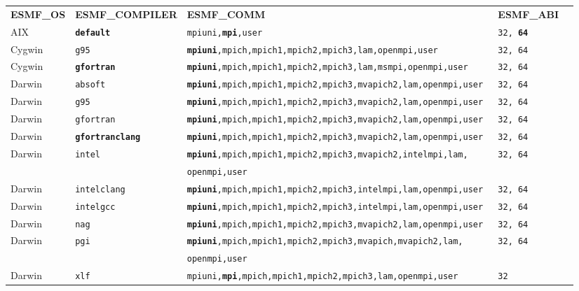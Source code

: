 \begin{longtable}{lllll}
  {\bfseries\footnotesize ESMF\_OS} &{\bfseries\footnotesize ESMF\_COMPILER} & {\bfseries\footnotesize ESMF\_COMM} & {\bfseries\footnotesize ESMF\_ABI} \\

AIX     &\tt {\bf default}        &\footnotesize \tt mpiuni,{\bf mpi},user      &\tt 32, {\bf 64} \\
Cygwin  &\tt g95                  &\footnotesize \tt {\bf mpiuni},mpich,mpich1,mpich2,mpich3,lam,openmpi,user &\tt 32, 64 \\
Cygwin  &\tt {\bf gfortran}       &\footnotesize \tt {\bf mpiuni},mpich,mpich1,mpich2,mpich3,lam,msmpi,openmpi,user &\tt 32, 64 \\
Darwin  &\tt absoft               &\footnotesize \tt {\bf mpiuni},mpich,mpich1,mpich2,mpich3,mvapich2,lam,openmpi,user &\tt 32, 64 \\
Darwin  &\tt g95                  &\footnotesize \tt {\bf mpiuni},mpich,mpich1,mpich2,mpich3,mvapich2,lam,openmpi,user &\tt 32, 64 \\
Darwin  &\tt gfortran             &\footnotesize \tt {\bf mpiuni},mpich,mpich1,mpich2,mpich3,mvapich2,lam,openmpi,user &\tt 32, 64 \\
Darwin  &\tt {\bf gfortranclang}  &\footnotesize \tt {\bf mpiuni},mpich,mpich1,mpich2,mpich3,mvapich2,lam,openmpi,user &\tt 32, 64 \\
Darwin  &\tt intel                &\footnotesize \tt {\bf mpiuni},mpich,mpich1,mpich2,mpich3,mvapich2,intelmpi,lam, &\tt 32, 64 \\
        &                         &\footnotesize \tt openmpi,user &  \\
Darwin  &\tt intelclang           &\footnotesize \tt {\bf mpiuni},mpich,mpich1,mpich2,mpich3,intelmpi,lam,openmpi,user &\tt 32, 64 \\
Darwin  &\tt intelgcc             &\footnotesize \tt {\bf mpiuni},mpich,mpich1,mpich2,mpich3,intelmpi,lam,openmpi,user &\tt 32, 64 \\
Darwin  &\tt nag                  &\footnotesize \tt {\bf mpiuni},mpich,mpich1,mpich2,mpich3,mvapich2,lam,openmpi,user &\tt 32, 64 \\
Darwin  &\tt pgi                  &\footnotesize \tt {\bf mpiuni},mpich,mpich1,mpich2,mpich3,mvapich,mvapich2,lam, &\tt 32, 64 \\
        &                         &\footnotesize \tt openmpi,user &  \\
Darwin  &\tt xlf                  &\footnotesize \tt mpiuni,{\bf mpi},mpich,mpich1,mpich2,mpich3,lam,openmpi,user &\tt 32 \\

\end{longtable}
